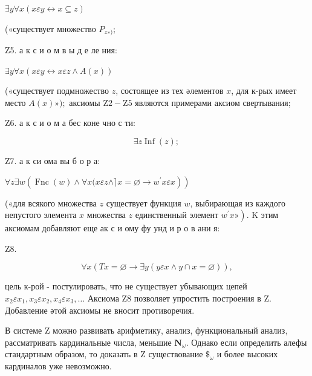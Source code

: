 \documentclass[10pt]{article}
\begin{document}
$\exists y \forall x(x \varepsilon y \leftrightarrow x \subseteq z)$



(«существует множество $P_{z »)}$;



Z5. а к с и о м в ы д е ле ния:



$\exists y \forall x(x \varepsilon y \leftrightarrow x \varepsilon z \wedge A(x))$



(«существует подмножество $z$, состоящее из тех әлементов $x$, для к-рых имеет место $A(x) ») ;$ аксиомы $\mathrm{Z} 2-\mathrm{Z} 5$ являются примерами аксиом свертывания;



Z6. а к с и о м а бес коне чно с ти:



\[

\exists z \operatorname{Inf}(z) \text {; }

\]



Z7. а к си ома вы б о р а:



$\left.\forall z \exists w\left(\operatorname{Fnc}(w) \wedge \forall x(x \varepsilon z \wedge\rceil x=\varnothing \longrightarrow w^{\prime} x \varepsilon x\right)\right)$



(«для всякого множества $z$ существует функция $w$, выбирающая из каждого непустого элемента $x$ множества $z$ единственный элемент $\left.w^{\prime} x »\right)$. $\mathrm{K}$ этим аксиомам добавляют еще ак с и ому фу унд и р о в ани я:



$\mathrm{Z} 8$.



\[

\forall x(T x=\varnothing \longrightarrow \exists y(y \varepsilon x \wedge y \cap x=\varnothing)),

\]



цель к-рой - постулировать, что не существует убывающих цепей $x_{2} \varepsilon x_{1}, x_{3} \varepsilon x_{2}, x_{4} \varepsilon x_{3}, \ldots$ Аксиома Z8 позволяет упростить построения в Z. Добавление әтой аксиомы не вносит противоречия.



В системе $\mathrm{Z}$ можно развивать арифметику, анализ, функциональный анализ, рассматривать кардинальные числа, меньшие $\boldsymbol{N}_{\omega}$. Однако если определить алефы стандартным образом, то доказать в Z существование $\boldsymbol{\$}_{\omega}$ и более высоких кардиналов уже невозможно.
\end{document}

